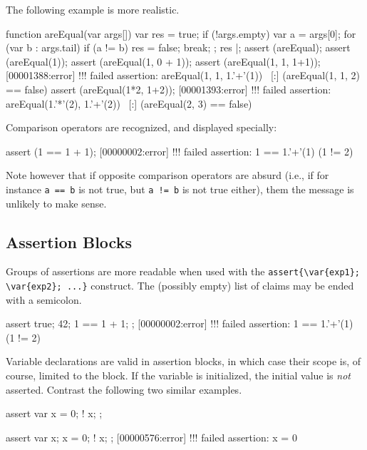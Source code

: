 The following example is more realistic.

\begin{urbiscript}
function areEqual(var args[])
{
  var res = true;
  if (!args.empty)
  {
    var a = args[0];
    for (var b : args.tail)
      if (a != b)
      {
        res = false;
        break;
      }
  };
  res
}|;
assert (areEqual);
assert (areEqual(1));
assert (areEqual(1, 0 + 1));
assert (areEqual(1, 1, 1+1));
[00001388:error] !!! failed assertion: areEqual(1, 1, 1.'+'(1)) \
[:]              (areEqual(1, 1, 2) == false)
assert (areEqual(1*2, 1+2));
[00001393:error] !!! failed assertion: areEqual(1.'*'(2), 1.'+'(2)) \
[:]              (areEqual(2, 3) == false)
\end{urbiscript}

Comparison operators are recognized, and displayed specially:
\begin{urbiscript}
assert (1 == 1 + 1);
[00000002:error] !!! failed assertion: 1 == 1.'+'(1) (1 != 2)
\end{urbiscript}

Note however that if opposite comparison operators are absurd (i.e., if for
instance \lstinline|a == b| is not true, but \lstinline|a != b| is not true
either), them the message is unlikely to make sense.

\subsection{Assertion Blocks}

Groups of assertions are more readable when used with the
\lstinline|assert{\var{exp1}; \var{exp2}; ...}| construct.  The (possibly
empty) list of claims may be ended with a semicolon.

\begin{urbiscript}
assert
{
  true;
  42;
  1 == 1 + 1;
};
[00000002:error] !!! failed assertion: 1 == 1.'+'(1) (1 != 2)
\end{urbiscript}

Variable declarations are valid in assertion blocks, in which case their
scope is, of course, limited to the block.  If the variable is initialized,
the initial value is \emph{not} asserted.  Contrast the following two
similar examples.

\begin{urbiscript}
assert
{
  var x = 0;
  ! x;
};

assert
{
  var x;
  x = 0;
  ! x;
};
[00000576:error] !!! failed assertion: x = 0
\end{urbiscript}

